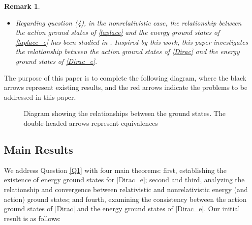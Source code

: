 \documentclass{amsart}
\theoremstyle{plain}
\newtheorem{remark}[theorem]{Remark}
\theoremstyle{definition}
\theoremstyle{remark}
\numberwithin{equation}{section} \numberwithin{figure}{section}
\begin{document}
\begin{remark}
\begin{itemize}
         
        \item[(d)]  Regarding question (4), in the nonrelativistic case, the relationship between the action  ground states of \eqref{laplace} and the energy ground states of \eqref{laplace_e} has been studied in \cite{DST23}. Inspired by this work, this paper investigates the relationship between the action ground states of \eqref{Dirac} and the energy ground states of \eqref{Dirac_e}.
     \end{itemize}
 \end{remark}

 
  The purpose of this paper is to complete the following diagram, where the black arrows represent existing results, and the red arrows indicate the problems to be addressed in this paper.


\begin{figure}[htbp]
  \centering
  \caption{Diagram showing the relationships between the ground states. The double-headed arrows represent equivalences}
  \label{fig:diagram}
  \end{figure}


\subsection{Main Results}
We address Question \ref{Q1} with four main theorems: first, establishing the existence of energy ground states for \eqref{Dirac_e}; second and third, analyzing the relationship and convergence between relativistic and nonrelativistic energy (and action) ground states; and fourth, examining the consistency between the action ground states of \eqref{Dirac} and the energy ground states of \eqref{Dirac_e}. Our initial result is as follows:
\end{document}
